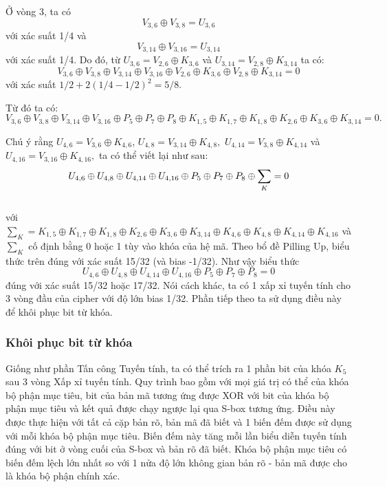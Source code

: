 Ở vòng 3, ta có 
$$ V_{3,6} \oplus V_{3,8} = U_{3,6}  $$ 
với xác suất 1/4 và 
$$ V_{3,14} \oplus V_{3,16} = U_{3,14}$$
với xác suất 1/4. Do đó, từ $U_{3,6} = V_{2,6} \oplus K_{3,6}$ và $U_{3,14} = V_{2,8} \oplus K_{3,14}$ ta có:
$$V_{3,6} \oplus V_{3,8} \oplus V_{3,14} \oplus V_{3,16} \oplus V_{2,6} \oplus K_{3,6} \oplus V_{2,8} \oplus K_{3,14} = 0$$
với xác suất $1/2 + 2(1/4-1/2)^2 = 5/8$.

Từ đó ta có:
$$ V_{3,6} \oplus V_{3,8} \oplus V_{3,14} \oplus V_{3,16} \oplus P_5 \oplus P_7 \oplus P_8 \oplus K_{1,5} \oplus K_{1,7} \oplus K_{1,8} \oplus K_{2,6} \oplus K_{3,6} \oplus K_{3,14} = 0.$$

Chú ý rằng $U_{4,6} = V_{3,6} \oplus K_{4,6}$, $U_{4,8} = V_{3,14} \oplus K_{4,8},$ $U_{4,14} = V_{3,8} \oplus K_{4,14}$ và $U_{4,16} = V_{3,16} \oplus K_{4,16},$ ta có thể viết lại như sau: 
$$ U_{4,6} \oplus U_{4,8} \oplus U_{4,14} \oplus U_{4,16} \oplus P_5 \oplus P_7 \oplus P_8 \oplus \small{\sum_{K}} = 0$$ \\
với
$\sum_{K} = K_{1,5} \oplus K_{1,7} \oplus K_{1,8} \oplus K_{2,6} \oplus K_{3,6} \oplus K_{3,14} \oplus K_{4,6} \oplus K_{4,8} \oplus K_{4,14} \oplus K_{4,16}$
và $\sum_K$ cố định bằng 0 hoặc 1 tùy vào khóa của hệ mã. Theo bổ đề Pilling Up, biểu thức trên đúng với xác suất 15/32 (và bias -1/32).
Như vậy biểu thức
 $$ U_{4,6} \oplus U_{4,8} \oplus U_{4,14} \oplus U_{4,16} \oplus P_5 \oplus P_7 \oplus P_8 = 0$$ 
 đúng với xác suất 15/32 hoặc 17/32. Nói cách khác, ta có 1 xấp xỉ tuyến tính cho 3 vòng đầu của cipher với độ lớn bias 1/32. Phần tiếp theo ta sử dụng điều này để khôi phục bit từ khóa.
 \subsubsection{Khôi phục bit từ khóa}
Giống như phần Tấn công Tuyến tính, ta có thể trích ra 1 phần bit của khóa $K_5$ sau 3 vòng Xấp xỉ tuyến tính. Quy trình bao gồm với mọi giá trị có thể của khóa bộ phận mục tiêu, bit của bản mã tương ứng được XOR với bit của khóa bộ phận mục tiêu và kết quả được chạy ngược lại qua S-box tương ứng. Điều này được thực hiện với tất cả cặp bản rõ, bản mã đã biết và 1 biến đếm được sử dụng với mỗi khóa bộ phận mục tiêu. Biến đếm này tăng mỗi lần biểu diễn tuyến tính đúng với bit ở vòng cuối của S-box và bản rõ đã biết. Khóa bộ phận mục tiêu có biến đếm lệch lớn nhất so với 1 nửa độ lớn không gian bản rõ - bản mã được cho là khóa bộ phận chính xác.

